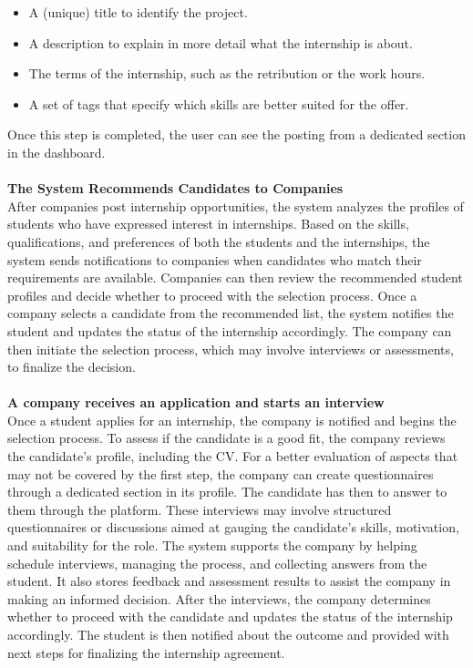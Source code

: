 \begin{itemize}
    \item A (unique) title to identify the project.
    \item A description to explain in more detail what the internship is about.
    \item The terms of the internship, such as the retribution or the work hours.
    \item A set of tags that specify which skills are better suited for the offer.
\end{itemize}
Once  this step is completed, the user can see the posting from a dedicated section in the dashboard.\\\\
\textbf{The System Recommends Candidates to Companies}\\
After companies post internship opportunities, the system analyzes the profiles of students who have expressed interest in internships. Based on the skills, qualifications, and preferences of both the students and the internships, the system sends notifications to companies when candidates who match their requirements are available. Companies can then review the recommended student profiles and decide whether to proceed with the selection process. Once a company selects a candidate from the recommended list, the system notifies the student and updates the status of the internship accordingly. The company can then initiate the selection process, which may involve interviews or assessments, to finalize the decision.\\\\
\textbf{A company receives an application and starts an interview}\\
Once a student applies for an internship, the company is notified and begins the selection process. To assess if the candidate is a good fit, the company reviews the candidate’s profile, including the CV. For a better evaluation of aspects that may not be covered by the first step, the company can create questionnaires through a dedicated section in its profile. The candidate has then to answer to them through the platform. These interviews may involve structured questionnaires or discussions aimed at gauging the candidate’s skills, motivation, and suitability for the role. The system supports the company by helping schedule interviews, managing the process, and collecting answers from the student. It also stores feedback and assessment results to assist the company in making an informed decision. After the interviews, the company determines whether to proceed with the candidate and updates the status of the internship accordingly. The student is then notified about the outcome and provided with next steps for finalizing the internship agreement.\\\\
